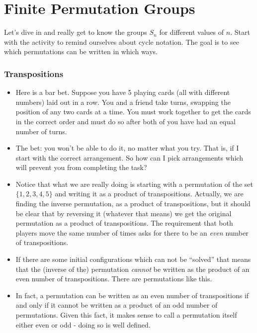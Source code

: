 \documentclass[12pt]{article}
\theoremstyle{plain}
\theoremstyle{definition}
\theoremstyle{remark}
\newcommand{\todayis}[1]{\clearpage{\rhead{\footnotesize #1}}}
\begin{document}
\todayis{Friday, February 22}

\section*{Finite Permutation Groups}

Let's dive in and really get to know the groups $S_n$ for different values of $n$.  Start with the activity to remind ourselves about cycle notation.  The goal is to see which permutations can be written in which ways.


\subsubsection*{Transpositions}
  \begin{itemize}
  \item Here is a bar bet.  Suppose you have 5 playing cards (all with different numbers) laid out in a row.  You and a friend take turns, swapping the position of any two cards at a time.  You must work together to get the cards in the correct order and must do so after both of you have had an equal number of turns.
  \item The bet: you won't be able to do it, no matter what you try.  That is, if I start with the correct arrangement.  So how can I pick arrangements which will prevent you from completing the task?  
  \item Notice that what we are really doing is starting with a permutation of the set $\{1,2,3,4,5\}$ and writing it as a product of transpositions.  Actually, we are finding the inverse permutation, as a product of transpositions, but it should be clear that by reversing it (whatever that means) we get the original permutation as a product of transpositions.  The requirement that both players move the same number of times asks for there to be an {\em even} number of transpositions.  
  \item If there are some initial configurations which can not be ``solved'' that means that the (inverse of the) permutation {\em cannot} be written as the product of an even number of transpositions.  There are permutations like this.
  \item In fact, a permutation can be written as an even number of transpositions if and only if it cannot be written as a product of an odd number of permutations. Given this fact, it makes sense to call a permutation itself either even or odd - doing so is well defined.
\end{itemize}
\end{document}
